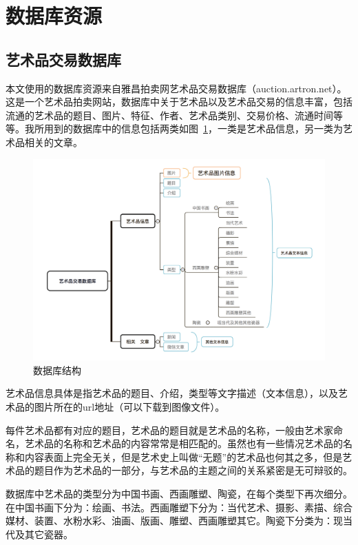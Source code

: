 \section{数据库资源}

\subsection{艺术品交易数据库}

本文使用的数据库资源来自雅昌拍卖网艺术品交易数据库（auction.artron.net）。这是一个艺术品拍卖网站，数据库中关于艺术品以及艺术品交易的信息丰富，包括流通的艺术品的题目、图片、特征、作者、艺术品类别、交易价格、流通时间等等。我所用到的数据库中的信息包括两类如图~\ref{figure:数据库结构}，一类是艺术品信息，另一类为艺术品相关的文章。

\begin{figure}[!htbp]
\centering
\includegraphics[width=\linewidth,keepaspectratio]{data/chapter-1/D02BCA18-F339-4988-9E23-E6C5E437BCCA.jpg}
\caption{数据库结构}
\label{figure:数据库结构}
\end{figure}

艺术品信息具体是指艺术品的题目、介绍，类型等文字描述（文本信息），以及艺术品的图片所在的url地址（可以下载到图像文件）。

每件艺术品都有对应的题目，艺术品的题目就是艺术品的名称，一般由艺术家命名，艺术品的名称和艺术品的内容常常是相匹配的。虽然也有一些情况艺术品的名称和内容表面上完全无关，但是艺术史上叫做“无题”的艺术品也何其之多，但是艺术品的题目作为艺术品的一部分，与艺术品的主题之间的关系紧密是无可辩驳的。

数据库中艺术品的类型分为中国书画、西画雕塑、陶瓷，在每个类型下再次细分。在中国书画下分为：绘画、书法。西画雕塑下分为：当代艺术、摄影、素描、综合媒材、装置、水粉水彩、油画、版画、雕塑、西画雕塑其它。陶瓷下分类为：现当代及其它瓷器。

